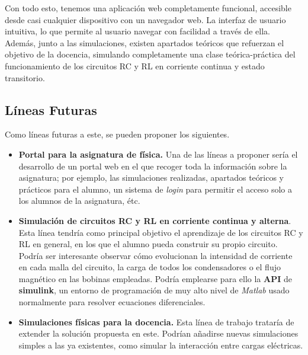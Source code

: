 \documentclass[../main.tex]{subfiles}
\begin{document}
Con todo esto, tenemos una aplicación web completamente funcional, accesible desde casi cualquier dispositivo con un navegador web. La interfaz de usuario intuitiva, lo que permite al usuario navegar con facilidad a través de ella. Además, junto a las simulaciones, existen apartados teóricos que refuerzan el objetivo de la docencia, simulando completamente una clase teórica-práctica del funcionamiento de los circuitos RC y RL en corriente continua y estado transitorio.



\subsection{Líneas Futuras}
Como líneas futuras a este, se pueden proponer los siguientes.

\begin{itemize}
    \item \textbf{Portal para la asignatura de física. }Una de las líneas a proponer sería el desarrollo de un portal web en el que recoger toda la información sobre la asignatura; por ejemplo, las simulaciones realizadas, apartados teóricos y prácticos para el alumno, un sistema de \textit{login} para permitir el acceso solo a los alumnos de la asignatura, étc. 


    \item \textbf{Simulación de circuitos RC y RL en corriente continua y alterna}. Esta línea tendría como principal objetivo el aprendizaje de los circuitos RC y RL en general, en los que el alumno pueda construir su propio circuito. Podría ser interesante observar cómo evolucionan la intensidad de corriente en cada malla del circuito, la carga de todos los condensadores o el flujo magnético en las bobinas empleadas. Podría emplearse para ello la \textbf{API} de \textbf{simulink}, un entorno de programación de muy alto nivel de \textit{Matlab} usado normalmente para resolver ecuaciones diferenciales.
    
    \item \textbf{Simulaciones físicas para la docencia. }Esta línea de trabajo trataría de extender la solución propuesta en este. Podrían añadirse nuevas simulaciones simples a las ya existentes, como simular la interacción entre cargas eléctricas.
    

\end{itemize}
\end{document}
